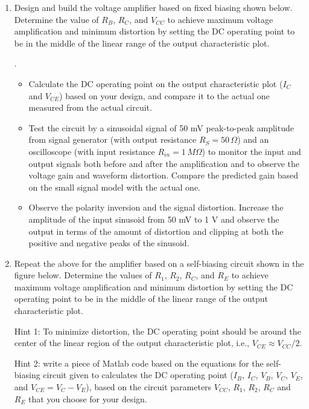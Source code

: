 \begin{enumerate}

\item Design and build the voltage amplifier based on fixed biasing
  shown below. Determine the value of $R_B$, $R_C$, and $V_{CC}$ to
  achieve maximum voltage amplification and minimum distortion by 
  setting the DC operating point to be in the middle of the linear
  range of the output characteristic plot. 

  .
  
  \begin{itemize}
  \item Calculate the DC operating point on the output characteristic 
    plot ($I_{C}$ and $V_{CE}$) based on your design, and compare it
    to the actual one measured from the actual circuit. 

  \item Test the circuit by a sinusoidal signal of 50 mV peak-to-peak 
    amplitude from signal generator (with output resistance 
    $R_S=50\,\Omega$) and an oscilloscope (with input resistance
    $R_{in}=1\,M\Omega$) to monitor the input and output signals both 
    before and after the amplification and to observe the voltage gain 
    and waveform distortion. Compare the predicted gain based on the
    small signal model with the actual one.

  \item Observe the polarity inversion and the signal distortion. 
    Increase the amplitude of the input sinusoid from 50 mV to 1 V 
    and observe the output in terms of the amount of distortion and 
    clipping at both the positive and negative peaks of the sinusoid.
  \end{itemize}

\item Repeat the above for the amplifier based on a self-biasing 
  circuit shown in the figure below. Determine the values of $R_1$, 
  $R_2$, $R_C$, and $R_E$ to achieve maximum voltage amplification and 
  minimum distortion by setting the DC operating point to be in the 
  middle of the linear range of the output characteristic plot. 

  Hint 1: To minimize distortion, the DC operating point 
  should be around the center of the linear region of the output
  characteristic plot, i.e., $V_{CE}\approx V_{CC}/2$.

  Hint 2: write a piece of Matlab code based on the equations for the
  self-biasing circuit given   
  to calculates the DC operating point ($I_B$, $I_C$, $V_B$, $V_C$, $V_E$,
  and $V_{CE}=V_C-V_E$), based on the circuit parameters $V_{CC}$, $R_1$,
  $R_2$, $R_C$ and $R_E$ that you choose for your design.


\end{enumerate}
